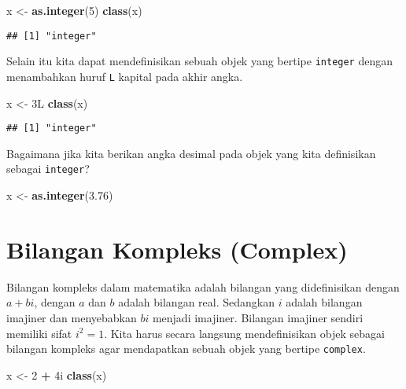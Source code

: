 \documentclass[
]{book}
\newenvironment{Shaded}{\begin{snugshade}}{\end{snugshade}}
\newcommand{\DecValTok}[1]{\textcolor[rgb]{0.00,0.00,0.81}{#1}}
\newcommand{\FloatTok}[1]{\textcolor[rgb]{0.00,0.00,0.81}{#1}}
\newcommand{\KeywordTok}[1]{\textcolor[rgb]{0.13,0.29,0.53}{\textbf{#1}}}
\newcommand{\NormalTok}[1]{#1}
\newcommand{\OperatorTok}[1]{\textcolor[rgb]{0.81,0.36,0.00}{\textbf{#1}}}
\newcommand{\StringTok}[1]{\textcolor[rgb]{0.31,0.60,0.02}{#1}}
\begin{document}
\begin{Shaded}
\begin{Highlighting}[]
\NormalTok{x <-}\StringTok{ }\KeywordTok{as.integer}\NormalTok{(}\DecValTok{5}\NormalTok{)}
\KeywordTok{class}\NormalTok{(x)}
\end{Highlighting}
\end{Shaded}

\begin{verbatim}
## [1] "integer"
\end{verbatim}

Selain itu kita dapat mendefinisikan sebuah objek yang bertipe \texttt{integer} dengan menambahkan huruf \texttt{L} kapital pada akhir angka.

\begin{Shaded}
\begin{Highlighting}[]
\NormalTok{x <-}\StringTok{ }\NormalTok{3L}
\KeywordTok{class}\NormalTok{(x)}
\end{Highlighting}
\end{Shaded}

\begin{verbatim}
## [1] "integer"
\end{verbatim}

Bagaimana jika kita berikan angka desimal pada objek yang kita definisikan sebagai \texttt{integer}?

\begin{Shaded}
\begin{Highlighting}[]
\NormalTok{x <-}\StringTok{ }\KeywordTok{as.integer}\NormalTok{(}\FloatTok{3.76}\NormalTok{)}
\end{Highlighting}
\end{Shaded}

\hypertarget{complex}{%
\section{Bilangan Kompleks (Complex)}\label{complex}}

Bilangan kompleks dalam matematika adalah bilangan yang didefinisikan dengan \(a + bi\), dengan \(a\) dan \(b\) adalah bilangan real. Sedangkan \(i\) adalah bilangan imajiner dan menyebabkan \(bi\) menjadi imajiner. Bilangan imajiner sendiri memiliki sifat \(i^{2}=1\). Kita harus secara langsung mendefinisikan objek sebagai bilangan kompleks agar mendapatkan sebuah objek yang bertipe \texttt{complex}.

\begin{Shaded}
\begin{Highlighting}[]
\NormalTok{x <-}\StringTok{ }\DecValTok{2} \OperatorTok{+}\StringTok{ }\NormalTok{4i}
\KeywordTok{class}\NormalTok{(x)}
\end{Highlighting}
\end{Shaded}
\end{document}
